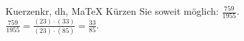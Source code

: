 \begin{MAufgabe}{Kuerzen}{kr, dh, MaTeX}
K\"urzen Sie soweit m\"oglich: $\frac{759}{1955}$.\\ 
\ifLsg\MLoesung
\quad $\frac{759}{1955}=\frac{(23)\cdot(33)}{(23)\cdot(85)}=\frac{33}{85}$.\else\relax\fi
 \end{MAufgabe}